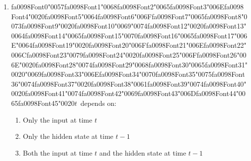 \documentclass[12pt]{article}
\begin{document}
\begin{enumerate}[label=Q\arabic*.]
\begin{enumerate}[label=(\Alph*)]
    \item The next word given the predicted history
    \item The next word given the ground-truth history
    \item The current word given itself
    \item All words simultaneously
\end{enumerate}
\item {\csname fa0098Font0\endcsname\char"0057}{\csname fa0098Font1\endcsname\char"0068}{\csname fa0098Font2\endcsname\char"0065}{\csname fa0098Font3\endcsname\char"006E}{\csname fa0098Font4\endcsname\char"0020}{\csname fa0098Font5\endcsname\char"0064}{\csname fa0098Font6\endcsname\char"006F}{\csname fa0098Font7\endcsname\char"0065}{\csname fa0098Font8\endcsname\char"0073}{\csname fa0098Font9\endcsname\char"0020}{\csname fa0098Font10\endcsname\char"0069}{\char"0074}{\csname fa0098Font12\endcsname\char"0020}{\csname fa0098Font13\endcsname\char"0064}{\csname fa0098Font14\endcsname\char"0065}{\csname fa0098Font15\endcsname\char"0070}{\csname fa0098Font16\endcsname\char"0065}{\csname fa0098Font17\endcsname\char"006E}{\char"0064}{\csname fa0098Font19\endcsname\char"0020}{\csname fa0098Font20\endcsname\char"006F}{\csname fa0098Font21\endcsname\char"006E}{\csname fa0098Font22\endcsname\char"006C}{\csname fa0098Font23\endcsname\char"0079}{\csname fa0098Font24\endcsname\char"0020}{\csname fa0098Font25\endcsname\char"006F}{\csname fa0098Font26\endcsname\char"006E}{\char"0020}{\csname fa0098Font28\endcsname\char"0074}{\csname fa0098Font29\endcsname\char"0068}{\csname fa0098Font30\endcsname\char"0065}{\csname fa0098Font31\endcsname\char"0020}{\char"0069}{\csname fa0098Font33\endcsname\char"006E}{\csname fa0098Font34\endcsname\char"0070}{\csname fa0098Font35\endcsname\char"0075}{\csname fa0098Font36\endcsname\char"0074}{\csname fa0098Font37\endcsname\char"0020}{\csname fa0098Font38\endcsname\char"0061}{\csname fa0098Font39\endcsname\char"0074}{\csname fa0098Font40\endcsname\char"0020}{\csname fa0098Font41\endcsname\char"0074}{\csname fa0098Font42\endcsname\char"0069}{\csname fa0098Font43\endcsname\char"006D}{\csname fa0098Font44\endcsname\char"0065}{\csname fa0098Font45\endcsname\char"0020}$t$\  depends on:
\begin{enumerate}[label=(\Alph*)]
    \item Only the input at time $t$
    \item Only the hidden state at time $t-1$
    \item Both the input at time $t$ and the hidden state at time $t-1$

\end{enumerate}
\end{enumerate}
\end{document}
